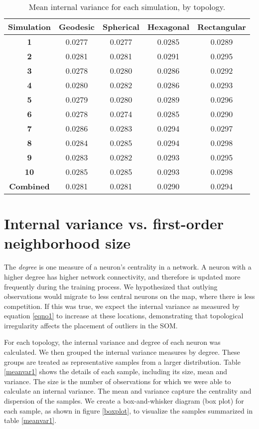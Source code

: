 \begin{table}[hbt]
\centering
\caption{Mean internal variance for each simulation, by topology.}
\label{ivtable3}
\begin{tabular}{|c||c|c|c|c|}
\hline
\textbf{Simulation} & Geodesic & Spherical & Hexagonal & Rectangular \\
\hline
\hline
\textbf{1} & 0.0277 & 0.0277 & 0.0285 & 0.0289 \\
\textbf{2} & 0.0281 & 0.0281 & 0.0291 & 0.0295 \\
\textbf{3} & 0.0278 & 0.0280 & 0.0286 & 0.0292 \\
\textbf{4} & 0.0280 & 0.0282 & 0.0286 & 0.0293 \\
\textbf{5} & 0.0279 & 0.0280 & 0.0289 & 0.0296 \\
\textbf{6} & 0.0278 & 0.0274 & 0.0285 & 0.0290 \\
\textbf{7} & 0.0286 & 0.0283 & 0.0294 & 0.0297 \\
\textbf{8} & 0.0284 & 0.0285 & 0.0294 & 0.0298 \\
\textbf{9} & 0.0283 & 0.0282 & 0.0293 & 0.0295 \\
\textbf{10}& 0.0285 & 0.0285 & 0.0293 & 0.0298 \\
\hline
\hline
\textbf{Combined} & 0.0281 & 0.0281 & 0.0290 & 0.0294\\
\hline
\end{tabular} \end{table}

\section{Internal variance vs. first-order neighborhood size}
\label{rdq1}
The \emph{degree} is one measure of a neuron's centrality in a network. A
neuron with a higher degree has higher network connectivity, and therefore is
updated more frequently during the training process.  We hypothesized that
outlying observations would migrate to less central neurons on the map, where
there is less competition.  If this was true, we expect the internal variance
as measured by equation \ref{eqno1} to increase at these locations,
demonstrating that topological irregularity affects the placement of outliers
in the SOM.  

For each topology, the internal variance and degree of each neuron was
calculated. We then grouped the internal variance measures by degree.  These groups are
treated as representative samples from a larger distribution. Table \ref{meanvar1}
shows the details of each sample, including its size, mean and variance. 
The size is the number of observations for which we were able to calculate an
internal variance. The mean and variance capture the centrality and
dispersion of the samples.  We create a box-and-whisker diagram (box plot) for
each sample, as shown in figure \ref{boxplot}, to visualize the samples
summarized in table \ref{meanvar1}.

